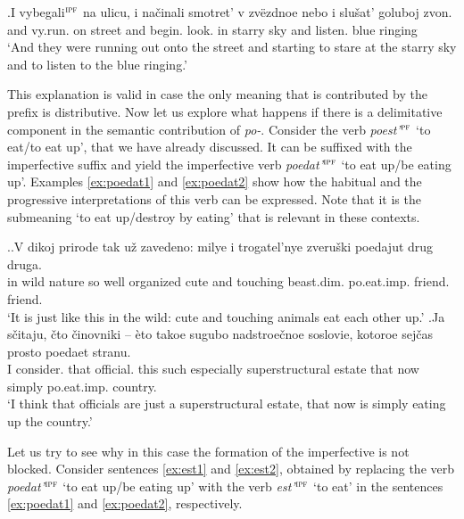 \exg.\label{ex:vybegat}I vybegali$^{\textsc{ipf}}$ na ulicu, i na\v{c}inali smotret' v zv\"{e}zdnoe nebo i slu\v{s}at' goluboj zvon.\\
and vy.run. on street and begin. look. in starry sky and listen. blue ringing\\
\trans `And they were running out onto the street and starting to stare at the starry sky and to listen to the blue ringing.'

This explanation is valid in case the only meaning that is contributed by the prefix is distributive. Now let us explore what happens if there is a delimitative component in the semantic contribution of \textit{po-}. Consider the verb \textit{poest'}$^{\textsc{pf}}$ `to eat/to eat up', that we have already discussed. It can be suffixed with the imperfective suffix and yield the imperfective verb \textit{poedat'}$^{\textsc{ipf}}$ `to eat up/be eating up'. Examples \ref{ex:poedat1} and \ref{ex:poedat2} show how the habitual and the progressive interpretations of this verb can be expressed. Note that it is the submeaning `to eat up/destroy by eating' that is relevant in these contexts.

\ex.\ag.\label{ex:poedat1}V dikoj prirode tak u\v{z} zavedeno: milye i trogatel'nye zveru\v{s}ki poedajut drug druga.\\
in wild nature so well organized cute and touching beast.dim. po.eat.imp. friend. friend.\\
\trans `It is just like this in the wild: cute and touching animals eat each other up.'
\bg.\label{ex:poedat2}Ja s\v{c}itaju, \v{c}to \v{c}inovniki -- \`{e}to takoe sugubo nadstroe\v{c}noe soslovie, kotoroe sej\v{c}as prosto poedaet stranu.\\
I consider. that official. {} this such especially superstructural estate that now simply po.eat.imp. country.\\
\trans `I think that officials are just a superstructural estate, that now is simply eating up the country.'\\

Let us try to see why in this case the formation of the imperfective is not blocked. Consider sentences \ref{ex:est1} and \ref{ex:est2}, obtained by replacing the verb \textit{poedat'}$^{\textsc{ipf}}$ `to eat up/be eating up' with the verb \textit{est'}$^{\textsc{ipf}}$ `to eat' in the sentences \ref{ex:poedat1} and \ref{ex:poedat2}, respectively.
 

